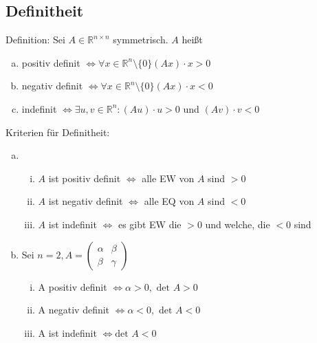 \subsection{Definitheit}

Definition: Sei $A \in \mathbb{R}^{n \times n}$ symmetrisch. $A$ heißt
\begin{enumerate} [a)]
    \item positiv definit $\Leftrightarrow \forall x \in \mathbb{R}^n \setminus \{0\} (Ax) \cdot x > 0$
    \item negativ definit $ \Leftrightarrow \forall x \in \mathbb{R}^n \setminus \{0\} (Ax) \cdot x < 0$
    \item indefinit $\Leftrightarrow \exists u,v \in \mathbb{R}^n: (Au) \cdot u > 0$ und $(Av) \cdot v < 0$
\end{enumerate}
\vspace{0.5cm}

Kriterien für Definitheit:
\begin{enumerate} [a)]
    \item \begin{enumerate} [i)]
        \item $A$ ist positiv definit $\Leftrightarrow$ alle EW von $A$ sind $> 0$
        \item $A$ ist negativ definit $\Leftrightarrow$ alle EQ von $A$ sind $< 0$
        \item $A$ ist indefinit $\Leftrightarrow$ es gibt EW die $> 0$ und welche, die $< 0$ sind
    \end{enumerate}
    \item Sei $n=2, A = \begin{pmatrix} \alpha & \beta \\ \beta & \gamma\end{pmatrix}$
    \begin{enumerate} [i)]
        \item A positiv definit $\Leftrightarrow \alpha > 0, \text{ det } A > 0$
        \item A negativ definit $\Leftrightarrow \alpha < 0, \text{ det } A < 0$
        \item A ist indefinit $\Leftrightarrow \text{det } A < 0$
    \end{enumerate}
\end{enumerate}


